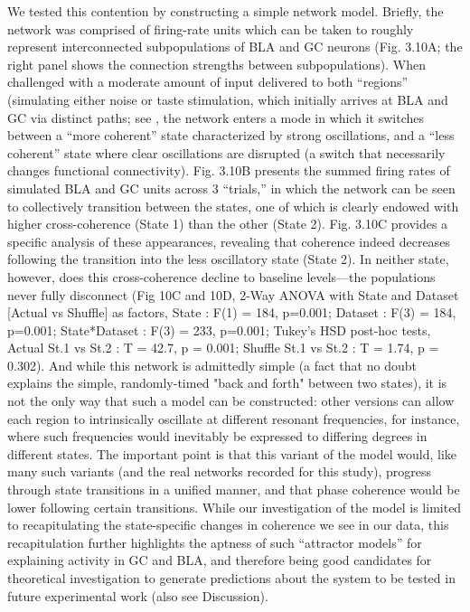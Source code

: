 \begin{refsection}
We tested this contention by constructing a simple network model. Briefly, the network was comprised of firing-rate units which can be taken to roughly represent interconnected subpopulations of BLA and GC neurons (Fig. 3.10A; the right panel shows the connection strengths between subpopulations). When challenged with a moderate amount of input delivered to both “regions” (simulating either noise or taste stimulation, which initially arrives at BLA and GC via distinct paths; see \cite{gal-ben-ari2012a}, the network enters a mode in which it switches between a “more coherent” state characterized by strong oscillations, and a “less coherent” state where clear oscillations are disrupted (a switch that necessarily changes functional connectivity). Fig. 3.10B presents the summed firing rates of simulated BLA and GC units across 3 “trials,” in which the network can be seen to collectively transition between the states, one of which is clearly endowed with higher cross-coherence (State 1) than the other (State 2).
Fig. 3.10C provides a specific analysis of these appearances, revealing that coherence indeed decreases following the transition into the less oscillatory state (State 2). In neither state, however, does this cross-coherence decline to baseline levels—the populations never fully disconnect (Fig 10C and 10D, 2-Way ANOVA with State and Dataset [Actual vs Shuffle] as factors, State : F(1) = 184, p=0.001; Dataset : F(3) = 184, p=0.001; State*Dataset : F(3) = 233, p=0.001; Tukey’s HSD post-hoc tests, Actual St.1 vs St.2 : T = 42.7, p = 0.001; Shuffle St.1 vs St.2 : T = 1.74, p = 0.302). And while this network is admittedly simple (a fact that no doubt explains the simple, randomly-timed "back and forth" between two states), it is not the only way that such a model can be constructed: other versions can allow each region to intrinsically oscillate at different resonant frequencies, for instance, where such frequencies would inevitably be expressed to differing degrees in different states. The important point is that this variant of the model would, like many such variants (and the real networks recorded for this study), progress through state transitions in a unified manner, and that phase coherence would be lower following certain transitions. While our investigation of the model is limited to recapitulating the state-specific changes in coherence we see in our data, this recapitulation further highlights the aptness of such “attractor models” for explaining activity in GC and BLA, and therefore being good candidates for theoretical investigation to generate predictions about the system to be tested in future experimental work (also see Discussion).


\end{refsection}
